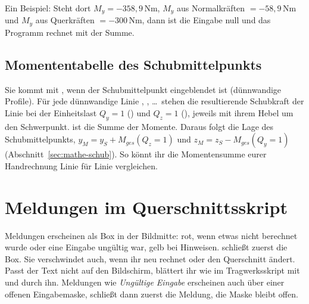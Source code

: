 Ein Beispiel: Steht dort $M_y = -358{,}9$\,Nm, $M_y$ aus Normalkräften $= -58{,}9$\,Nm und $M_y$ aus
Querkräften $= -300$\,Nm, dann ist die Eingabe null und das Programm rechnet mit der Summe.

\subsection{Momententabelle des Schubmittelpunkts}

Sie kommt mit , wenn der Schubmittelpunkt eingeblendet ist (dünnwandige Profile). Für
jede dünnwandige Linie , , \dots\ stehen die resultierende Schubkraft der Linie
bei der Einheitslast $Q_y = 1$ () und $Q_z = 1$ (), jeweils mit ihrem
Hebel um den Schwerpunkt.  ist die Summe der Momente. Daraus folgt die Lage des
Schubmittelpunkts, $y_M = y_S + M_{ges}(Q_z = 1)$ und $z_M = z_S - M_{ges}(Q_y = 1)$
(Abschnitt~\ref{sec:mathe-schub}). So könnt ihr die Momentensumme eurer Handrechnung Linie für
Linie vergleichen.

\section{Meldungen im Querschnittsskript}

Meldungen erscheinen als Box in der Bildmitte: rot, wenn etwas nicht berechnet wurde oder eine
Eingabe ungültig war, gelb bei Hinweisen.  schließt zuerst die Box. Sie verschwindet
auch, wenn ihr neu rechnet oder den Querschnitt ändert. Passt der Text nicht auf den Bildschirm,
blättert ihr wie im Tragwerksskript mit \taste{$\uparrow$} und \taste{$\downarrow$} durch ihn.
Meldungen wie \emph{Ungültige Eingabe} erscheinen auch über einer offenen Eingabemaske,
 schließt dann zuerst die Meldung, die Maske bleibt offen.

